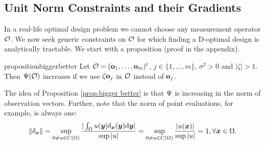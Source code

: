 \subsection{Unit Norm Constraints and their Gradients}\label{subsec:unit norm}
In a real-life optimal design problem we cannot choose any measurement
operator $\mathcal{O}$. We now seek generic constraints on $\mathcal{O}$ for which
finding a D-optimal design is analytically tractable. We start with a
proposition (proof in the appendix).

\begin{restatable*}{proposition}{biggerbetter}\label{prop:bigger better}
  Let $\mathcal{O} = (\mathbf{o}_1,\dots,\mathbf{o}_m)^t$, $j \in \{1,\dots,m\}$,
  $\sigma^2 > 0$ and $|\zeta| > 1$. Then $\Psi(\mathcal{O})$ increases if we
  use $\zeta \mathbf{o}_j$ in $\mathcal{O}$ instead of $\mathbf{o}_j$.
\end{restatable*}


The idea of Proposition \ref{prop:bigger better} is that $\Psi$ is
increasing in the norm of observation vectors. Further, note that the
norm of point evaluations, for example, is always one:
\begin{align*}
  \| \delta_{\x} \| = \sup_{0 \neq u \in C(\Omega)} \frac{
    |\int_{\Omega}u(\y) \delta_{\x}(\y) \der \y| 
  }{
    \sup|u|}
  = \sup_{0 \neq u \in C(\Omega)} \frac{|u(\x)|}{ \sup|u|} = 1,
  \forall \x \in \Omega.
\end{align*}

